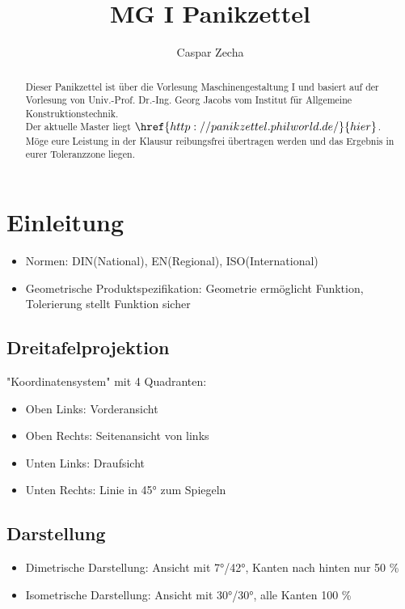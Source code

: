 \documentclass[a4paper,parskip=half*,DIV=7,fontsize=11pt]{scrartcl}
\title{MG I Panikzettel}
\author{Caspar Zecha}
\begin{document}
	
\maketitle
	
\begin{abstract}
	Dieser Panikzettel ist über die Vorlesung Maschinengestaltung I und basiert auf der Vorlesung von Univ.-Prof. Dr.-Ing. Georg Jacobs vom Institut für Allgemeine Konstruktionstechnik.\\
	Der aktuelle Master liegt $\href{http://panikzettel.philworld.de/}{hier}$.\\
	Möge eure Leistung in der Klausur reibungsfrei übertragen werden und das Ergebnis in eurer Toleranzzone liegen.\\
\end{abstract}
	
\tableofcontents
	
\pagebreak
	
\section{Einleitung}
\begin{itemize}
	\item Normen: DIN(National), EN(Regional), ISO(International)
	\item Geometrische Produktspezifikation: Geometrie ermöglicht Funktion, Tolerierung stellt Funktion sicher
\end{itemize}
	
\subsection{Dreitafelprojektion}
"Koordinatensystem" mit 4 Quadranten:
\begin{itemize}
	\item Oben Links: Vorderansicht
	\item Oben Rechts: Seitenansicht von links
	\item Unten Links: Draufsicht
	\item Unten Rechts: Linie in 45° zum Spiegeln
\end{itemize}
	
\subsection{Darstellung}
\begin{itemize}
	\item Dimetrische Darstellung: Ansicht mit 7°/42°, Kanten nach hinten nur 50 \%
	\item Isometrische Darstellung: Ansicht mit 30°/30°, alle Kanten 100 \%
\end{itemize}
	
\end{document}

